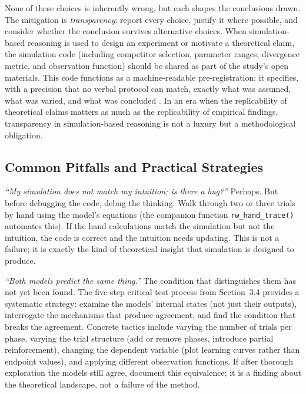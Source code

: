 \documentclass[fleqn,10pt]{wlscirep}
\begin{document}
\begin{linenumbers}
None of these choices is inherently wrong, but each shapes the conclusions drawn. The mitigation is \emph{transparency}: report every choice, justify it where possible, and consider whether the conclusion survives alternative choices. When simulation-based reasoning is used to design an experiment or motivate a theoretical claim, the simulation code (including competitor selection, parameter ranges, divergence metric, and observation function) should be shared as part of the study's open materials. This code functions as a machine-readable pre-registration: it specifies, with a precision that no verbal protocol can match, exactly what was assumed, what was varied, and what was concluded \citep{nosek2018preregistration, schad2021workflow}. In an era when the replicability of theoretical claims matters as much as the replicability of empirical findings, transparency in simulation-based reasoning is not a luxury but a methodological obligation.

\subsection{Common Pitfalls and Practical Strategies}

\emph{``My simulation does not match my intuition; is there a bug?''} Perhaps. But before debugging the code, debug the thinking. Walk through two or three trials by hand using the model's equations (the companion function \texttt{rw\_hand\_trace()} automates this). If the hand calculations match the simulation but not the intuition, the code is correct and the intuition needs updating. This is not a failure; it is exactly the kind of theoretical insight that simulation is designed to produce.

\emph{``Both models predict the same thing.''} The condition that distinguishes them has not yet been found. The five-step critical test process from Section~3.4 provides a systematic strategy: examine the models' internal states (not just their outputs), interrogate the mechanisms that produce agreement, and find the condition that breaks the agreement. Concrete tactics include varying the number of trials per phase, varying the trial structure (add or remove phases, introduce partial reinforcement), changing the dependent variable (plot learning curves rather than endpoint values), and applying different observation functions. If after thorough exploration the models still agree, document this equivalence; it is a finding about the theoretical landscape, not a failure of the method.


\end{linenumbers}
\end{document}

